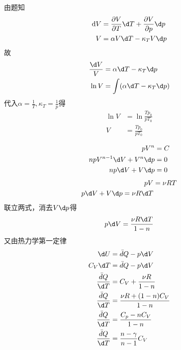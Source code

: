 \documentclass{phyasgn}
\begin{document}
\begin{sol}[1]
    由题知
    \begin{align*}
        \mathrm{d} V&=\frac{\partial V}{\partial T}\d T+\frac{\partial V}{\partial p}\d p\\
        V&=\alpha V\d T-\kappa_T V\d p\\
    \end{align*}
    故
    \begin{align*}
        \frac{\d V}{V}&=\alpha \d T-\kappa_T \d p\\
        \ln V&=\int (\alpha\d T-\kappa_T\d p)
    \end{align*}
    代入$\alpha=\frac{1}{T},\kappa_T=\frac{1}{p}$得
    \begin{align*}
        \ln V&=\ln\frac{Tp_0}{pT_0}\\
        V&=\frac{Tp_0}{pT_0}
    \end{align*}
\end{sol}\par

\begin{sol}[2]
    \begin{align*}
        pV^n&=C\\
        npV^{n-1}\d V+V^n\d p&=0\\
        np\d V+V\d p&=0
    \end{align*}
    \begin{align*}
        pV&=\nu RT\\
        p\d V+V\d p=\nu R\d T
    \end{align*}
    联立两式，消去$V\d p$得
    \begin{align*}
        p\d V=\frac{\nu R\d T}{1-n}
    \end{align*}
    又由热力学第一定律
    \begin{align*}
        \d U&=\bar{d}Q-p\d V\\
        C_V\d T&=\bar{d}Q-p\d V\\
        \frac{\bar{d}Q}{\d T}&=C_V+\frac{\nu R}{1-n}\\
        \frac{\bar{d}Q}{\d T}&=\frac{\nu R+(1-n)C_V}{1-n}\\
        \frac{\bar{d}Q}{\d T}&=\frac{C_p-nC_V}{1-n}\\
        \frac{\bar{d}Q}{\d T}&=\frac{n-\gamma}{n-1}C_V
    \end{align*}
\end{sol}\par
\end{document}
